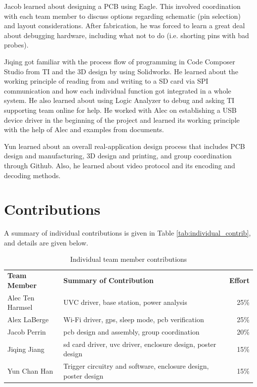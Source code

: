 \documentclass[12pt]{article}
\begin{document}
Jacob learned about designing a PCB using Eagle. This involved coordination
with each team member to discuss options regarding schematic (pin selection)
and layout considerations. After fabrication, he was forced to learn a great
deal about debugging hardware, including what not to do (i.e. shorting pins
with bad probes).

Jiqing got familiar with the process flow of programming in Code Composer
Studio from TI and the 3D design by using Solidworks. He learned about the
working principle of reading from and writing to a SD card via SPI
communication and how each individual function got integrated in a whole
system. He also learned about using Logic Analyzer to debug and asking TI
supporting team online for help. He worked with Alec on establishing a USB
device driver in the beginning of the project and learned its working principle
with the help of Alec and examples from documents.

Yun learned about an overall real-application design process that includes PCB
design and manufacturing, 3D design and printing, and group coordination
through Github. Also, he learned about video protocol and its encoding and
decoding methods.

\section{Contributions}
A summary of individual contributions is given in Table
\ref{tab:individual_contrib}, and details are given below.

\begin{table}[h]
    \centering
    \caption{Individual team member contributions}
    \begin{tabular}{llr}
        \textbf{Team Member} & \textbf{Summary of Contribution} & \textbf{Effort}\\
        Alec Ten Harmsel & UVC driver, base station, power analysis & 25\%\\
        Alex LaBerge & Wi-Fi driver, \gls{gps}, sleep mode, \gls{pcb} verification & 25\%\\
        Jacob Perrin & \gls{pcb} design and assembly, group coordination & 20\%\\
        Jiqing Jiang & \gls{sd} card driver, \gls{uvc} driver, enclosure design, poster design & 15\%\\
        Yun Chan Han & Trigger circuitry and software, enclosure design, poster design & 15\%\\
    \end{tabular}
\end{table}
\end{document}
